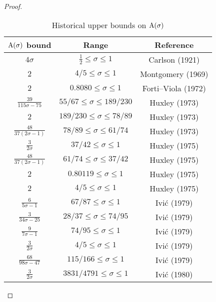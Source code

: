 \begin{proof}
\begin{table}[ht]
    \def\arraystretch{1.3}
    \centering
    \caption{Historical upper bounds on $\mathrm{A}(\sigma)$}
    \begin{tabular}{|c|c|c|}
    \hline
    $\mathrm{A}(\sigma)$ bound & Range & Reference\\
    \hline
    $4\sigma$ & $\frac{1}{2} \leq \sigma \le 1$ & Carlson (1921) \cite{carlson_uber_1921}\\
    \hline
    $2$ & $4/5 \leq \sigma \leq 1$ & Montgomery (1969) \cite{montgomery_1969} \\
    \hline
    $2$ & $0.8080 \leq \sigma \leq 1$ & Forti--Viola (1972) \cite{forti-viola} \\
    \hline
    $\frac{39}{115\sigma-75}$ & $55/67 \leq \sigma \leq 189/230$ & Huxley (1973) \cite{huxley_large_1973} \\
    \hline
    $2$ & $189/230 \leq \sigma \leq 78/89$ & Huxley (1973) \cite{huxley_large_1973} \\
    \hline
    $\frac{48}{37(2\sigma-1)}$ & $78/89 \leq \sigma \leq 61/74$ & Huxley (1973) \cite{huxley_large_1973} \\
    \hline
    $\frac{3}{2\sigma}$ & $37/42 \leq \sigma \leq 1$ & Huxley (1975) \cite{huxley_large_1975a}\\
    \hline
    $\frac{48}{37(2\sigma-1)}$ & $61/74 \leq \sigma \leq 37/42$ & Huxley (1975) \cite{huxley_large_1975a}\\
    \hline
    $2$ & $0.80119 \leq \sigma \leq 1$ & Huxley (1975) \cite{huxley_large_1975a}\\
    \hline
    $2$ & $4/5 \leq \sigma \leq 1$ & Huxley (1975) \cite{huxley_large_1975b}\\
    \hline
    $\frac{6}{5\sigma-1}$ & $67/87 \leq \sigma \leq 1$ & Ivi\'c (1979) \cite{ivic_note_1979} \\
    \hline
    $\frac{3}{34\sigma-25}$ & $28/37 \leq \sigma \leq 74/95$ & Ivi\'c (1979) \cite{ivic_note_1979} \\
    \hline
    $\frac{9}{7\sigma-1}$ & $74/95 \leq \sigma \leq 1$ & Ivi\'c (1979) \cite{ivic_note_1979} \\
    \hline
    $\frac{3}{2\sigma}$ & $4/5 \leq \sigma \leq 1$ & Ivi\'c (1979) \cite{ivic_note_1979} \\
    \hline
    $\frac{68}{98\sigma-47}$ & $115/166 \leq \sigma \leq 1$ & Ivi\'c (1979) \cite{ivic_note_1979} \\
    \hline
    $\frac{3}{2\sigma}$ & $3831/4791 \leq \sigma \leq 1$ & Ivi\'c (1980) \cite{ivic_exponent_pairs}  \\

\end{tabular}
\end{table}
\end{proof}
